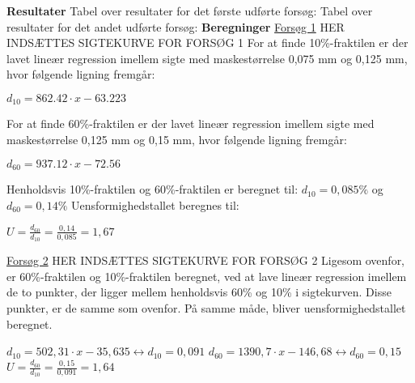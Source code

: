 \newline
\newline
\textbf{Resultater}
\newline
Tabel over resultater for det første udførte forsøg:
\newline
\newline
Tabel over resultater for det andet udførte forsøg:
\newline
\newline
\textbf{Beregninger}
\newline
\underline{Forsøg 1}
\newline
\newline
HER INDSÆTTES SIGTEKURVE FOR FORSØG 1
\newline
\newline
For at finde 10\%-fraktilen er der lavet lineær regression imellem sigte med maskestørrelse 0,075 mm og 0,125 mm, hvor følgende ligning fremgår: 

\begin{center}
	$d_{10}=862.42\cdot x - 63.223$
\end{center}

For at finde 60\%-fraktilen er der lavet lineær regression imellem sigte med maskestørrelse 0,125 mm og 0,15 mm, hvor følgende ligning fremgår:

\begin{center}
	$d_{60}=937.12\cdot x - 72.56$
\end{center}

Henholdsvis 10\%-fraktilen og 60\%-fraktilen er beregnet til: $d_{10}=0,085\%$ og $d_{60}=0,14\%$
\newline
\newline
Uensformighedstallet beregnes til:

\begin{center}
	$U = \frac{d_{60}}{d_{10}} = \frac{0,14}{0,085} = 1,67$
\end{center}

\underline{Forsøg 2}
\newline
\newline
HER INDSÆTTES SIGTEKURVE FOR FORSØG 2
\newline
\newline
Ligesom ovenfor, er 60\%-fraktilen og 10\%-fraktilen beregnet, ved at lave lineær regression imellem de to punkter, der ligger mellem henholdsvis 60\% og 10\% i sigtekurven. Disse punkter, er de samme som ovenfor. På samme måde, bliver uensformighedstallet beregnet. 

\begin{center}
	$d_{10}=502,31\cdot x - 35,635 \leftrightarrow d_{10}=0,091$
	\newline
	\newline
	$d_{60}=1390,7\cdot x - 146,68 \leftrightarrow d_{60}=0,15$
	\newline
	\newline 
	$U = \frac{d_{60}}{d_{10}} = \frac{0,15}{0,091} = 1,64$
\end{center}

